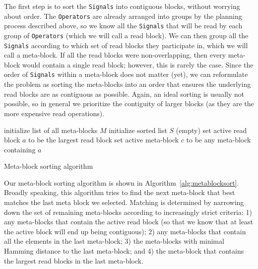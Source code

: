 \documentclass{article}
\begin{document}
The first step is to sort the \texttt{Signals} into contiguous blocks, without worrying about order.  The \texttt{Operators} are already arranged into groups by the planning process described above, so we know all the \texttt{Signals} that will be read by each group of \texttt{Operators} (which we will call a read block).  We can then group all the \texttt{Signals} according to which set of read blocks they participate in, which we will call a meta-block.  If all the read blocks were non-overlapping, then every meta-block would contain a single read block; however, this is rarely the case.  Since the order of \texttt{Signals} within a meta-block does not matter (yet), we can reformulate the problem as sorting the meta-blocks into an order that ensures the underlying read blocks are as contiguous as possible.  Again, an ideal sorting is usually not possible, so in general we prioritize the contiguity of larger blocks (as they are the more expensive read operations).

\begin{algorithm}
\DontPrintSemicolon
initialize list of all meta-blocks $M$\;
initialize sorted list $S$ (empty)\;
set active read block $a$ to be the largest read block\;
set active meta-block $c$ to be any meta-block containing $a$\;
\caption{Meta-block sorting algorithm}
\label{alg:metablocksort}
\end{algorithm}

Our meta-block sorting algorithm is shown in Algorithm~\ref{alg:metablocksort}.  Broadly speaking, this algorithm tries to find the next meta-block that best matches the last meta block we selected.  Matching is determined by narrowing down the set of remaining meta-blocks according to increasingly strict criteria: 1) any meta-blocks that contain the active read block (so that we know that at least the active block will end up being contiguous); 2) any meta-blocks that contain all the elements in the last meta-block; 3) the meta-blocks with minimal Hamming distance to the last meta-block; and 4) the meta-block that contains the largest read blocks in the last meta-block.
\end{document}
